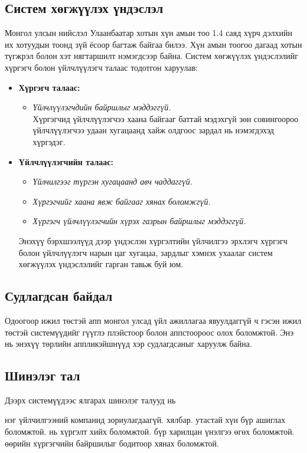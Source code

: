 \begin{intro}
\subsection*{Систем хөгжүүлэх үндэслэл}
Монгол улсын нийслэл Улаанбаатар хотын хүн амын тоо 1.4 саяд хүрч дэлхийн их хотуудын тоонд зүй ёсоор багтаж байгаа билээ. Хүн амын тоогоо дагаад хотын түгжрэл болон хэт нягтаршилт нэмэгдсээр байна. Систем хөгжүүлэх үндэслэлийг хүргэгч болон үйлчлүүлэгч талаас  тодотгон харуулав:
\begin{itemize}
\item \textbf{Хүргэгч талаас:}
\begin{itemize}[label={--}]
\item\textit{Үйлчлүүлэгчдийн байршлыг мэддэггүй.}\\
Хүргэгчид үйлчлүүлэгчээ хаана байгааг баттай мэдэхгүй зөн совингоороо үйлчлүүлэгчээ удаан хугацаанд хайж олдгоос зардал нь нэмэгдэхэд хүргэдэг.
\end{itemize}
\item \textbf{Үйлчлүүлэгчийн талаас:}
\begin{itemize}[label={--}]
\item\textit{Үйлчилгээг түргэн хугацаанд авч чаддаггүй.}
\item\textit{Хүргэгчийг хаана явж байгааг хянах боломжгүй.}
\item\textit{Хүргэгч үйлчлүүлэгчийн хүрэх газрын байршлыг мэддэггүй.}
\end{itemize}
Энэхүү бэрхшээлүүд дээр үндэслэн хүргэлтийн үйлчилгээ эрхлэгч хүргэгч болон үйлчлүүлэгч нарын цаг хугацаа, зардлыг хэмнэх ухаалаг систем хөгжүүлэх үндэслэлийг гарган тавьж буй юм.
\end{itemize}

\subsection*{Судлагдсан байдал}
Одоогоор ижил төстэй апп монгол улсад үйл ажиллагаа явуулдаггүй ч гэсэн ижил төстэй системүүдийг гүүглэ плэйстоор болон аппстоороос олох боломжтой. Энэ нь энэхүү төрлийн аппликэйшнүүд хэр судлагдсаныг харуулж байна.

\subsection*{Шинэлэг тал}
Дээрх системүүдээс ялгарах шинэлэг талууд нь
\begin{itemize}[label={--}]
     нэг үйлчилгээний компанид зориулагдаагүй.
     хялбар.
     утастай хүн бүр ашиглах боломжтой.
     нь хүргэлт хийх боломжтой.
     бүр харилцан үнэлгээ өгөх боломжтой.
     өөрийн хүргэгчийн байршилыг бодитоор хянах боломжтой.
\end{itemize}



\end{intro}
